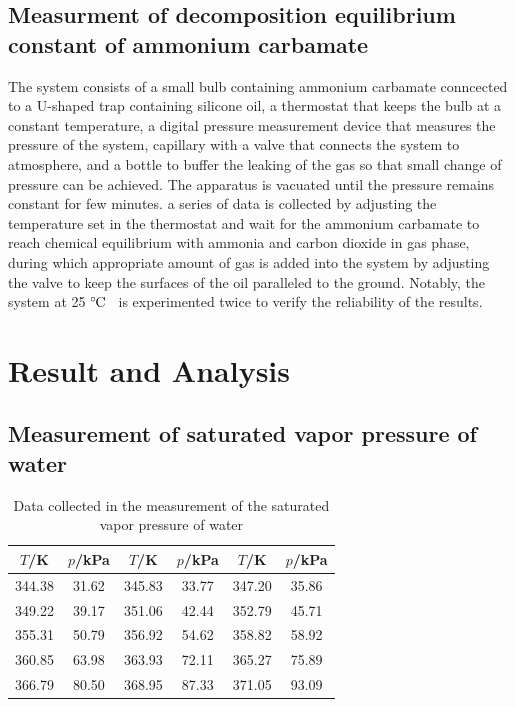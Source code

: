 \documentclass[%
 reprint,
 amsmath,amssymb,
 aps,
10.5pt,
]{revtex4-1}
\newcommand{\celsius}{\ensuremath{^\circ\hspace{-0.09em}\mathrm{C}}}
\begin{document}
\subsection{Measurment of decomposition equilibrium constant of ammonium carbamate}
The system consists of a small bulb containing ammonium carbamate conncected to a U-shaped trap containing silicone oil, a thermostat that keeps the bulb at a constant temperature, a digital pressure measurement device that measures the pressure of the system, capillary with a valve that connects the system to atmosphere, and a bottle to buffer the leaking of the gas so that small change of pressure can be achieved. The apparatus is vacuated until the pressure remains constant for few minutes. a series of data is collected by adjusting the temperature set in the thermostat and wait for the ammonium carbamate to reach chemical equilibrium with ammonia and carbon dioxide in gas phase, during which appropriate amount of gas is added into the system by adjusting the valve to keep the surfaces of the oil paralleled to the ground. Notably, the system at 25 \celsius~ is experimented twice to verify the reliability of the results.

\section{Result and Analysis}
\subsection{Measurement of saturated vapor pressure of water}
\begin{table}
\centering
\caption{Data collected in the measurement of the saturated vapor pressure of water}
\begin{tabular}{cc|cc|cc}\hline
$T$/K & $p$/kPa & $T$/K & $p$/kPa & $T$/K & $p$/kPa \\\hline
 344.38 & 31.62 & 345.83 & 33.77 & 347.20 & 35.86 \\
 349.22 & 39.17 & 351.06 & 42.44 & 352.79 & 45.71 \\
 355.31 & 50.79 & 356.92 & 54.62 & 358.82 & 58.92 \\
 360.85 & 63.98 & 363.93 & 72.11 & 365.27 & 75.89 \\
 366.79 & 80.50 & 368.95 & 87.33 & 371.05 & 93.09 \\\hline
 \end{tabular}
 \label{waterdata}
 \end{table}
\end{document}
